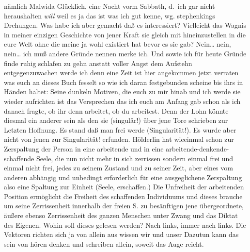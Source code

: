 \documentclass[
]{article}
\begin{document}
\begin{enumerate}
  nämlich Malwida Glücklich, eine Nacht vorm Sabbath, d.~ich gar nicht
  heraushalten \emph{will} weil es ja das ist was ich gut kenne, wg.
  stephenkings Drehungen. Was habe ich aber gemacht daß es interessiert?
  Vielleicht das Wagnis in meiner einzigen Geschichte von jener Kraft
  sie gleich mit hineinzustellen in die eure Welt ohne die meine ja wohl
  existiert hat bevor es sie gab? Nein\ldots{} nein, nein\ldots{} ich
  muß andere Gründe nennen merke ich. Und sowie ich für heute Gründe
  finde ruhig schlafen zu gehn anstatt voller Angst dem Aufstehn
  entgegenzuwachen werde ich denn eine Zeit ist hier angekommen jetzt
  verraten was euch an dieses Buch fesselt so wie ich daran festgebunden
  scheine bis ihrs in Händen haltet: Seine dunkeln Motiven, die euch zu
  mir hinab und ich werde sie wieder aufrichten ist das Versprechen das
  ich euch am Anfang gab schon als ich danach fragte, ob ihr denn
  arbeitet, ob du arbeitest. Denn der Lohn könnte diesmal ein anderer
  sein als den sie (singulär!) über jene Tore schrieben zur Letzten
  Hoffnung. Es stand daß man frei werde (Singularität!). Es wurde aber
  nicht von jenen zur Singularität! erfunden. Hölderlin hat wieeinmal
  schon zur Zerspaltung der Person in eine arbeitende und in eine
  arbeitende-denkende-schaffende Seele, die nun nicht mehr in sich
  zerrissen sondern einmal frei und einmal nicht frei, jedes zu seinem
  Zustand und zu seiner Zeit, aber eines vom anderen abhängig und
  unbedingt erforderlich für eine ausgeglichene Zerspaltung also eine
  Spaltung zur Einheit (Seele, erschaffen.) Die Unfreiheit der
  arbeitenden Position ermöglicht die Freiheit des schaffenden
  Individuums und dieses brauche um seine Zerrissenheit innerhalb der
  freien S. zu besänftigen jene übergeordnete, äußere ebenso
  Zerrissenheit des ganzen Menschen unter Zwang und das Diktat des
  Eigenen. Wohin soll dieses gelesen werden? Nach links, immer nach
  links. Die Vektoren richten sich ja von allein aus wissen wir und
  unser Dazutun kann das sein von hören denken und schreiben allein,
  soweit das Auge reicht.
\end{enumerate}
\end{document}
